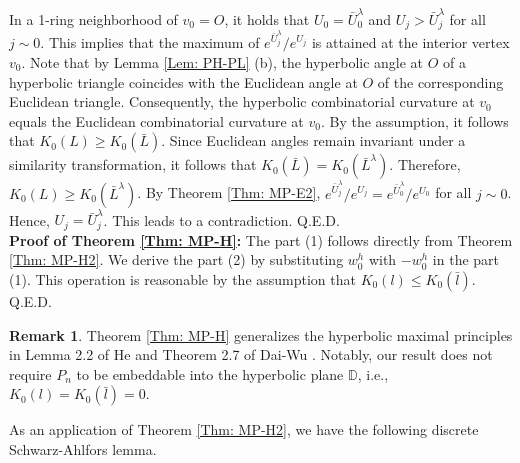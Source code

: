 \documentclass[12pt]{amsart}
\theoremstyle{definition}
\newtheorem{remark}[theorem]{Remark}
\def\qed{\hfill{Q.E.D.}\smallskip}
\begin{document}
In a 1-ring neighborhood of $v_0=O$, it holds that $U_0=\bar U_0^\lambda$ and $U_j>\bar{U}_j^\lambda$ for all $j\sim 0$.
This implies that the maximum of $e^{\bar{U}_j^\lambda}/e^{U_j}$ is attained at the interior vertex $v_0$.
Note that by Lemma \ref{Lem: PH-PL} (b), the hyperbolic angle at $O$ of a hyperbolic triangle coincides with the Euclidean angle at $O$ of the corresponding Euclidean triangle.
Consequently, the hyperbolic combinatorial curvature at $v_0$ equals the Euclidean combinatorial curvature at $v_0$.
By the assumption, it follows that $K_0(L)\geq K_0(\bar{L})$.
Since Euclidean angles remain invariant under a similarity transformation,
it follows that $K_0(\bar{L})=K_0(\bar{L}^\lambda)$.
Therefore, $K_0(L)\geq K_0(\bar{L}^\lambda)$.
By Theorem \ref{Thm: MP-E2}, $e^{\bar{U}_j^\lambda}/e^{U_j}=e^{\bar{U}_0^\lambda}/e^{U_0}$ for all $j\sim 0$.
Hence, $U_j=\bar U_j^\lambda$.
This leads to a contradiction.
\qed
\\


\noindent\textbf{Proof of Theorem \ref{Thm: MP-H}:}
The part (1) follows directly from Theorem \ref{Thm: MP-H2}.
We derive the part (2) by substituting $w^h_0$ with $-w^h_0$ in the part (1).
This operation is reasonable by the assumption that $K_0(l)\leq K_0(\bar{l})$.
\qed

\begin{remark}
Theorem \ref{Thm: MP-H} generalizes the hyperbolic maximal principles in Lemma 2.2 of He \cite{He} and Theorem 2.7 of Dai-Wu \cite{Dai-Wu}. Notably, our result does not require $P_n$ to be embeddable into the hyperbolic plane $\mathbb{D}$, i.e., $K_0(l)= K_0(\bar{l})= 0$.
\end{remark}


As an application of Theorem \ref{Thm: MP-H2}, we have the following discrete Schwarz-Ahlfors lemma.
\end{document}
